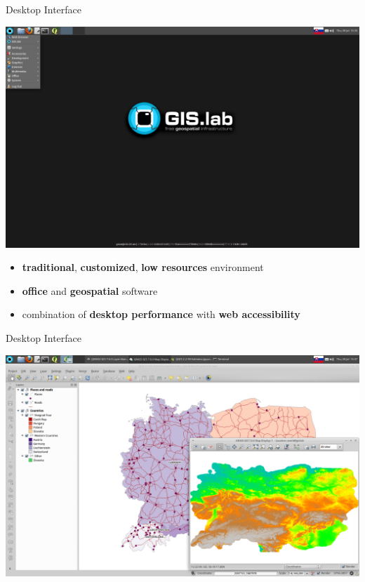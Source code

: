 \documentclass[12pt]{beamer}
\begin{document}
\begin{frame}{Desktop Interface}
	\begin{center}
		\includegraphics[keepaspectratio=true,height=0.5\textheight]{images/gislab-desktop.png}
	\end{center}
	\begin{itemize}
		\item \textbf{traditional}, \textbf{customized}, \textbf{low resources} environment
		\item \textbf{office} and \textbf{geospatial} software
		\item combination of \textbf{desktop performance} with \textbf{web accessibility}
	\end{itemize}
\end{frame}

\begin{frame}[plain]{Desktop Interface}
	\begin{center}
		\includegraphics[keepaspectratio=true,width=\textwidth]{images/gislab-desktop-2.png}
	\end{center}
\end{frame}
\end{document}
